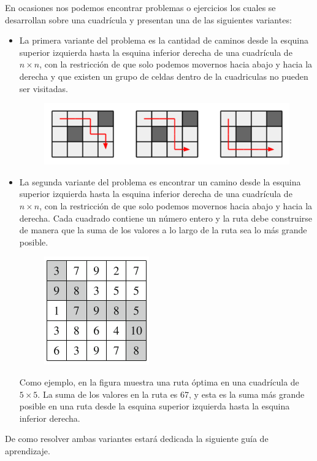 En ocasiones nos podemos encontrar problemas o ejercicios los cuales se desarrollan sobre una cuadrícula y presentan una de las siguientes variantes:

\begin{itemize}
	
	\item La primera variante del problema es la cantidad de caminos desde la esquina superior izquierda hasta la esquina inferior derecha de una cuadrícula de $n \times n$, con la restricción de que solo podemos movernos hacia abajo y hacia la derecha y que existen un grupo de celdas dentro de la cuadriculas no pueden ser visitadas.
	
	\begin{figure}[h!]
		\centering
		\includegraphics[width=0.7\linewidth]{img/grid_path_iii}
		\label{fig:gridpathiii}
	\end{figure}
	
	\item La segunda variante del problema es encontrar un camino desde la esquina superior izquierda hasta la esquina inferior derecha de una cuadrícula de $n \times n$, con la restricción de que solo podemos movernos hacia abajo y hacia la derecha. Cada cuadrado contiene un número entero y la ruta debe construirse de manera que la suma de los valores a lo largo de la ruta sea lo más grande posible.
	
	\begin{figure}[h!]
		\centering
		\includegraphics[width=0.3\linewidth]{img/grid_path_i}
		\label{fig:gridpathi}
	\end{figure}
	
	
	Como ejemplo, en la figura  muestra una ruta óptima en una cuadrícula de $5 \times 5$. La suma de los valores en la ruta es 67, y esta es la suma más grande posible en una ruta desde la esquina superior izquierda hasta la esquina inferior derecha.
	
\end{itemize}




De como resolver ambas variantes estará dedicada la siguiente guía de aprendizaje.